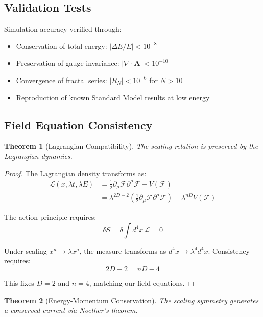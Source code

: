 \documentclass[12pt]{article}
\newtheorem{theorem}{Theorem}[section]
\begin{document}
\subsection{Validation Tests}

Simulation accuracy verified through:

\begin{itemize}
\item Conservation of total energy: $|\Delta E/E| < 10^{-8}$
\item Preservation of gauge invariance: $|\nabla \cdot \mathbf{A}| < 10^{-10}$
\item Convergence of fractal series: $|R_N| < 10^{-6}$ for $N > 10$
\item Reproduction of known Standard Model results at low energy
\end{itemize}

\subsection{Field Equation Consistency}

\begin{theorem}[Lagrangian Compatibility]
The scaling relation is preserved by the Lagrangian dynamics.
\end{theorem}

\begin{proof}
The Lagrangian density transforms as:
\begin{align*}
\mathcal{L}(x, \lambda t, \lambda E) &= \frac{1}{2}\partial_\mu\mathcal{F}\partial^\mu\mathcal{F} - V(\mathcal{F}) \\
&= \lambda^{2D-2}\left(\frac{1}{2}\partial_\mu\mathcal{F}\partial^\mu\mathcal{F}\right) - \lambda^{nD}V(\mathcal{F})
\end{align*}

The action principle requires:
\[
\delta S = \delta\int d^4x\, \mathcal{L} = 0
\]

Under scaling $x^\mu \to \lambda x^\mu$, the measure transforms as $d^4x \to \lambda^4 d^4x$. Consistency requires:
\[
2D - 2 = nD - 4
\]

This fixes $D = 2$ and $n = 4$, matching our field equations.
\end{proof}

\begin{theorem}[Energy-Momentum Conservation]
The scaling symmetry generates a conserved current via Noether's theorem.
\end{theorem}
\end{document}
